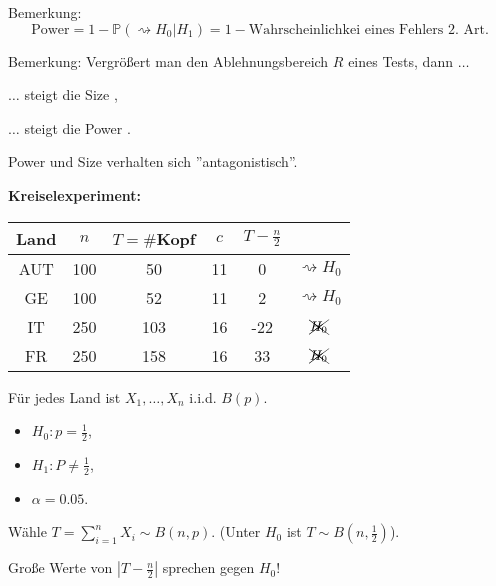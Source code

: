 \documentclass{tstextbook}
\newcommand{\Prob}{\mathbb P}
\begin{document}
\begin{remark}
	Bemerkung: 
	\[
	\text{Power} = 1-\Prob(\rightsquigarrow H_0|H_1) = 1- \text{Wahrscheinlichkei eines Fehlers 2. Art}.
	\]
\end{remark}

\begin{remark}
	Bemerkung:
	Vergrößert man den Ablehnungsbereich $ R $ eines Tests, dann $\ldots$
	
	$\ldots$ steigt die Size \frownie, 
	
	$\ldots$ steigt die Power \smiley. 
	
	Power und Size verhalten sich ''antagonistisch''.
\end{remark}

\begin{example}
	
	\textbf{Kreiselexperiment:}
	\vspace{0.5cm}
	
\begin{center}
	\begin{tabular}{c|c|c|c|c|c}
		Land 	& $ n $ 	& $ T=\# $Kopf 	& $ c $ 	& $ T-\frac{n}{2} $ 	& \\
		\midrule
		AUT		& 100		& 50 			& 11		& 0						& $ \rightsquigarrow H_0 $ \\
		GE		& 100		& 52 			& 11		& 2						& $ \rightsquigarrow H_0 $ \\
		IT		& 250		& 103 			& 16		& -22					& $ \xcancel{H_0} $ \\
		FR		& 250		& 158 			& 16		& 33					& $ \xcancel{H_0} $ \\
	\end{tabular}
\end{center}
	\vspace{0.5cm}
	
	Für jedes Land ist $ X_1,\ldots,X_n $ i.i.d. $ B(p) $. 
	\begin{itemize}
		\item $ H_0\colon p=\frac{1}{2} $,
		\item $ H_1\colon P\ne \frac{1}{2} $,
		\item $ \alpha = 0.05 $.
	\end{itemize}
	
	Wähle $ T=\sum_{i=1}^{n}X_i \sim B(n,p) $. (Unter $ H_0 $ ist $ T\sim B\left(n,\frac{1}{2}\right) $).
	
	Große Werte von $ |T-\frac{n}{2}| $ sprechen gegen $ H_0 $!
	

\end{example}
\end{document}
